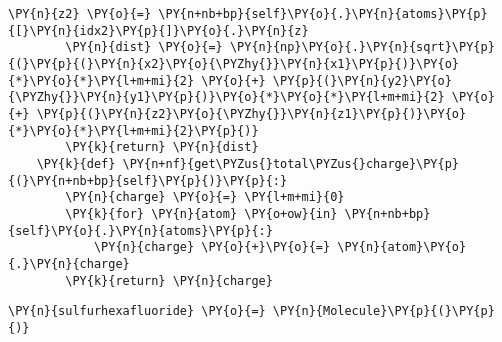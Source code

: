 \begin{tcolorbox}[breakable, size=fbox, boxrule=1pt, pad at break*=1mm,colback=cellbackground, colframe=cellborder]
\begin{Verbatim}[commandchars=\\\{\}]
        \PY{n}{z2} \PY{o}{=} \PY{n+nb+bp}{self}\PY{o}{.}\PY{n}{atoms}\PY{p}{[}\PY{n}{idx2}\PY{p}{]}\PY{o}{.}\PY{n}{z}
        \PY{n}{dist} \PY{o}{=} \PY{n}{np}\PY{o}{.}\PY{n}{sqrt}\PY{p}{(}\PY{p}{(}\PY{n}{x2}\PY{o}{\PYZhy{}}\PY{n}{x1}\PY{p}{)}\PY{o}{*}\PY{o}{*}\PY{l+m+mi}{2} \PY{o}{+} \PY{p}{(}\PY{n}{y2}\PY{o}{\PYZhy{}}\PY{n}{y1}\PY{p}{)}\PY{o}{*}\PY{o}{*}\PY{l+m+mi}{2} \PY{o}{+} \PY{p}{(}\PY{n}{z2}\PY{o}{\PYZhy{}}\PY{n}{z1}\PY{p}{)}\PY{o}{*}\PY{o}{*}\PY{l+m+mi}{2}\PY{p}{)}
        \PY{k}{return} \PY{n}{dist}
    \PY{k}{def} \PY{n+nf}{get\PYZus{}total\PYZus{}charge}\PY{p}{(}\PY{n+nb+bp}{self}\PY{p}{)}\PY{p}{:}
        \PY{n}{charge} \PY{o}{=} \PY{l+m+mi}{0}
        \PY{k}{for} \PY{n}{atom} \PY{o+ow}{in} \PY{n+nb+bp}{self}\PY{o}{.}\PY{n}{atoms}\PY{p}{:}
            \PY{n}{charge} \PY{o}{+}\PY{o}{=} \PY{n}{atom}\PY{o}{.}\PY{n}{charge}
        \PY{k}{return} \PY{n}{charge}
\end{Verbatim}
\end{tcolorbox}

    \begin{tcolorbox}[breakable, size=fbox, boxrule=1pt, pad at break*=1mm,colback=cellbackground, colframe=cellborder]
\begin{Verbatim}[commandchars=\\\{\}]
\PY{n}{sulfurhexafluoride} \PY{o}{=} \PY{n}{Molecule}\PY{p}{(}\PY{p}{)}
\end{Verbatim}
\end{tcolorbox}

